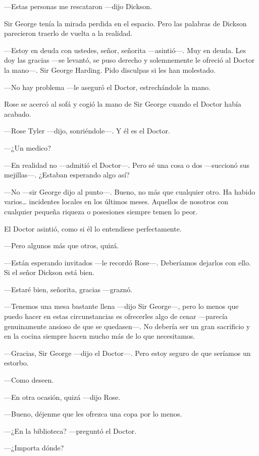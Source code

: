 {---Estas personas me rescataron ---dijo Dickson.}

{Sir George tenía la mirada perdida en el espacio. Pero las palabras de
Dickson parecieron traerlo de vuelta a la realidad.}

{---Estoy en deuda con ustedes, señor, señorita ---asintió---. Muy en
deuda. Les doy las gracias ---se levantó, se puso derecho y solemnemente
le ofreció al Doctor la mano---. Sir George Harding. Pido disculpas si
les han molestado.}

{---No hay problema ---le aseguró el Doctor, estrechándole la mano.}

{Rose se acercó al sofá y cogió la mano de Sir George cuando el Doctor
había acabado.}

{---Rose Tyler ---dijo, sonriéndole---. Y él es el Doctor.}

{---¿Un medico?}

{---En realidad no ---admitió el Doctor---. Pero sé una cosa o dos
---succionó sus mejillas---. ¿Estaban esperando algo así?}

{---No ---sir George dijo al punto---. Bueno, no más que cualquier otro.
Ha habido varios\ldots{} incidentes locales en los últimos meses.
Aquellos de nosotros con cualquier pequeña riqueza o posesiones siempre
temen lo peor.}

{El Doctor asintió, como si él lo entendiese perfectamente.}

{---Pero algunos más que otros, quizá.}

{---Están esperando invitados ---le recordó Rose---. Deberíamos dejarlos
con ello. Si el señor Dickson está bien.}

{---Estaré bien, señorita, gracias ---graznó.}

{---Tenemos una mesa bastante llena ---dijo Sir George---, pero lo menos
que puedo hacer en estas circunstancias es ofrecerles algo de cenar
---parecía genuinamente ansioso de que se quedasen---. No debería ser un
gran sacrificio y en la cocina siempre hacen mucho más de lo que
necesitamos.}

{---Gracias, Sir George ---dijo el Doctor---. Pero estoy seguro de que
seríamos un estorbo.}

{---Como deseen.}

{---En otra ocasión, quizá ---dijo Rose.}

{---Bueno, déjenme que les ofrezca una copa por lo menos.}

{---¿En la biblioteca? ---preguntó el Doctor.}

{---¿Importa dónde?}

